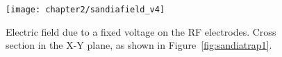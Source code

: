 \begin{figure}[h!t]
\centering
\texttt{[image: chapter2/sandiafield\_v4]}
\caption[Calculation of the electric field in the Sandia trap]{Electric field due to a fixed voltage on the RF electrodes. Cross section in the X-Y plane, as shown in Figure~\ref{fig:sandiatrap1}.}
\label{fig:sandiafield}
\end{figure} 


%
%



